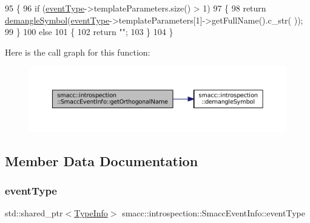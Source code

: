 \begin{DoxyCode}
95 \{
96     \textcolor{keywordflow}{if} (\hyperlink{structsmacc_1_1introspection_1_1SmaccEventInfo_af3bdf1abf797864e681662d92a5515f9}{eventType}->templateParameters.size() > 1)
97     \{
98         \textcolor{keywordflow}{return} \hyperlink{namespacesmacc_1_1introspection_a2f495108db3e57604d8d3ff5ef030302}{demangleSymbol}(\hyperlink{structsmacc_1_1introspection_1_1SmaccEventInfo_af3bdf1abf797864e681662d92a5515f9}{eventType}->templateParameters[1]->getFullName().c\_str(
      ));
99     \}
100     \textcolor{keywordflow}{else}
101     \{
102         \textcolor{keywordflow}{return} \textcolor{stringliteral}{""};
103     \}
104 \}
\end{DoxyCode}
Here is the call graph for this function\+:
\nopagebreak
\begin{figure}[H]
\begin{center}
\leavevmode
\includegraphics[width=350pt]{structsmacc_1_1introspection_1_1SmaccEventInfo_a7a507eea65876ba22033300f316cae89_cgraph}
\end{center}
\end{figure}


\subsection{Member Data Documentation}
\mbox{\label{structsmacc_1_1introspection_1_1SmaccEventInfo_af3bdf1abf797864e681662d92a5515f9}} 
\subsubsection{\texorpdfstring{event\+Type}{eventType}}
{\footnotesize\ttfamily std\+::shared\+\_\+ptr$<$\hyperlink{classsmacc_1_1introspection_1_1TypeInfo}{Type\+Info}$>$ smacc\+::introspection\+::\+Smacc\+Event\+Info\+::event\+Type}



